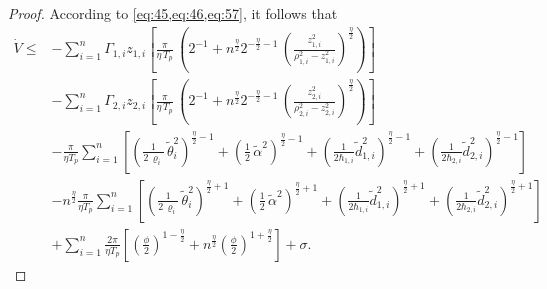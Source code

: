 \documentclass[pdflatex,sn-mathphys-num]{sn-jnl}%
\theoremstyle{thmstyleone}%
\theoremstyle{thmstyletwo}%
\theoremstyle{thmstylethree}%
\begin{document}
\begin{proof}
According to \cref{eq:45,eq:46,eq:57}, it follows that
\begin{equation}\label{eq:58}
	\begin{aligned}
		\dot{V} \le& - \sum_{i=1}^{n}\varGamma_{1,i}z_{1,i}\left[\frac{\pi}{\eta\,T_p}\,
		\left( 2^{-1}+n^{\frac\eta2} 2^{-\tfrac\eta2 -1}\,\left(\frac{z_{1,i}^2}{\rho_{1,i}^2 - z_{1,i}^2}\right)^{\frac{\eta}{2}}\right)  \right]    \\
		&                      
		- \sum_{i=1}^{n}\varGamma_{2,i}z_{2,i}\left[\frac{\pi}{\eta\,T_p}\,
		 \left( 2^{-1}+n^{\frac\eta2} 2^{-\tfrac\eta2 -1}\,\left(\frac{z_{2,i}^2}{\rho_{2,i}^2 - z_{2,i}^2}\right)^{\frac{\eta}{2}}\right)  \right]\\
	&-\frac{\pi}{\eta T_{p}}\sum_{i=1}^{n}\left[ \left(\frac{1}{2\,\varrho_i}\,\tilde \theta_{i}^2\right)^{\frac{\eta}{2}-1}+\left(\frac{1}{2}\,{\tilde{\alpha}}^2\right)^{\frac{\eta}{2}-1}+\left(\frac{1}{2\hbar_{1,i}}{\tilde d}^2_{1,i}\right)^{\frac{\eta}{2}-1}+\left(\frac{1}{2\hbar_{2,i}}{\tilde d}^2_{2,i}\right)^{\frac{\eta}{2}-1}\right] \\
		        & - n^{\frac\eta2}\frac{\pi}{\eta T_{p}}\sum_{i=1}^{n}\left[
		\left(\frac{1}{2\,\varrho_i}\,\tilde \theta_{i}^2\right)^{\frac{\eta}{2}+1}+\left(\frac{1}{2}\,{\tilde{\alpha}}^2\right)^{\frac{\eta}{2}+1}+\left(\frac{1}{2\hbar_{1,i}}{\tilde d}^2_{1,i}\right)^{\frac{\eta}{2}+1}+\left(\frac{1}{2\hbar_{2,i}}{\tilde d}^2_{2,i}\right)^{\frac{\eta}{2}+1} \right]   \\
		&        
		+\sum_{i=1}^{n}\frac{2\pi}{\eta T_{p}} \left[  \left(\frac{\phi}{2}\right)^{1-\frac{\eta}{2}} + n^{\frac\eta2}\left(\frac{\phi}{2}\right)^{1+\frac{\eta}{2}}  \right]+\sigma  .                  
	\end{aligned}
\end{equation}



\end{proof}
\end{document}
